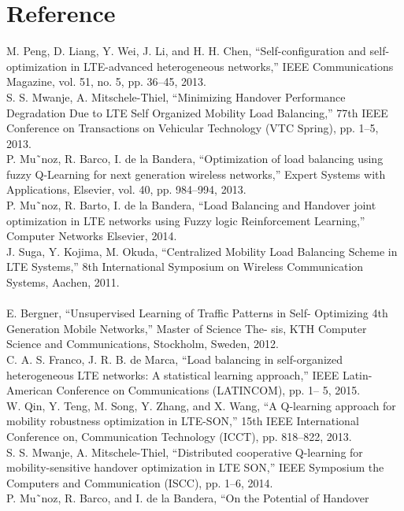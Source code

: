 \documentclass[12pt]{article}
\begin{document}
\section{Reference}
\begin{multicols}{2}
\noindent [134] M. Peng, D. Liang, Y. Wei, J. Li, and H. H. Chen, “Self-configuration
and self-optimization in LTE-advanced heterogeneous networks,” IEEE
Communications Magazine, vol. 51, no. 5, pp. 36–45, 2013. \\ \noindent 
[135] S. S. Mwanje, A. Mitschele-Thiel, “Minimizing Handover Performance
Degradation Due to LTE Self Organized Mobility Load Balancing,”
77th IEEE Conference on Transactions on Vehicular Technology (VTC
Spring), pp. 1–5, 2013. \\ \noindent 
[136] P. Mu˜noz, R. Barco, I. de la Bandera, “Optimization of load balancing
using fuzzy Q-Learning for next generation wireless networks,” Expert
Systems with Applications, Elsevier, vol. 40, pp. 984–994, 2013.\\ \noindent 
[137] P. Mu˜noz, R. Barto, I. de la Bandera, “Load Balancing and Handover
joint optimization in LTE networks using Fuzzy logic Reinforcement
Learning,” Computer Networks Elsevier, 2014.\\ \noindent 
[138] J. Suga, Y. Kojima, M. Okuda, “Centralized Mobility Load Balancing
Scheme in LTE Systems,” 8th International Symposium on Wireless
Communication Systems, Aachen, 2011.\\ \noindent 
\\ \noindent [139] E. Bergner, “Unsupervised Learning of Traffic Patterns in Self-
Optimizing 4th Generation Mobile Networks,” Master of Science The-
sis, KTH Computer Science and Communications, Stockholm, Sweden,
2012.
\\ \noindent [140] C. A. S. Franco, J. R. B. de Marca, “Load balancing in self-organized
heterogeneous LTE networks: A statistical learning approach,” IEEE
Latin-American Conference on Communications (LATINCOM), pp. 1–
5, 2015.
\\ \noindent [141] W. Qin, Y. Teng, M. Song, Y. Zhang, and X. Wang, “A Q-learning approach
for mobility robustness optimization in LTE-SON,” 15th IEEE
International Conference on, Communication Technology (ICCT), pp.
818–822, 2013.
\\ \noindent [142] S. S. Mwanje, A. Mitschele-Thiel, “Distributed cooperative Q-learning
for mobility-sensitive handover optimization in LTE SON,” IEEE
Symposium the Computers and Communication (ISCC), pp. 1–6, 2014.
\\ \noindent [143] P. Mu˜noz, R. Barco, and I. de la Bandera, “On the Potential of Handover

\end{multicols}
\end{document}
